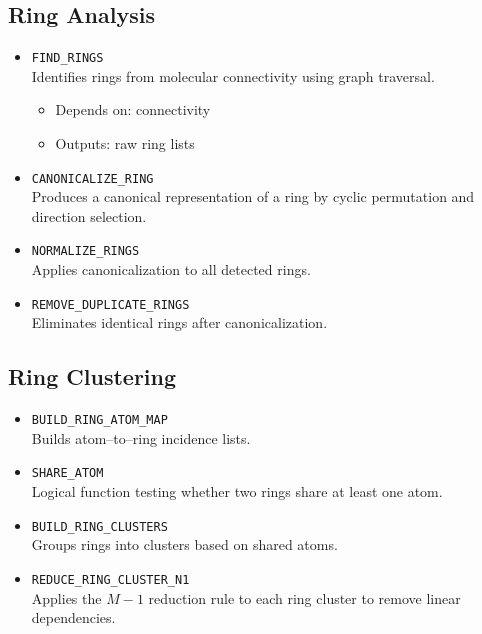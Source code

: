 \documentclass[11pt,a4paper]{article}
\begin{document}
\subsection{Ring Analysis}

\begin{itemize}
  \item \texttt{FIND\_RINGS} \\
  Identifies rings from molecular connectivity using graph traversal.
  \begin{itemize}
    \item Depends on: connectivity
    \item Outputs: raw ring lists
  \end{itemize}

  \item \texttt{CANONICALIZE\_RING} \\
  Produces a canonical representation of a ring by cyclic permutation and
  direction selection.

  \item \texttt{NORMALIZE\_RINGS} \\
  Applies canonicalization to all detected rings.

  \item \texttt{REMOVE\_DUPLICATE\_RINGS} \\
  Eliminates identical rings after canonicalization.
\end{itemize}

\subsection{Ring Clustering}

\begin{itemize}
  \item \texttt{BUILD\_RING\_ATOM\_MAP} \\
  Builds atom--to--ring incidence lists.

  \item \texttt{SHARE\_ATOM} \\
  Logical function testing whether two rings share at least one atom.

  \item \texttt{BUILD\_RING\_CLUSTERS} \\
  Groups rings into clusters based on shared atoms.

  \item \texttt{REDUCE\_RING\_CLUSTER\_N1} \\
  Applies the $M-1$ reduction rule to each ring cluster to remove linear
  dependencies.
\end{itemize}
\end{document}
